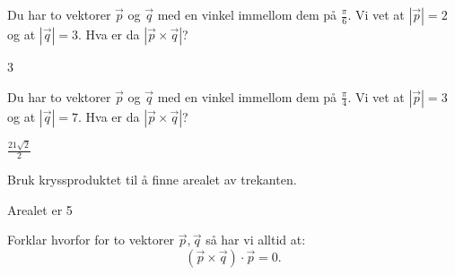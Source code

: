 \documentclass[12pt,answer]{exam}
\begin{document}
\begin{questions}
\question Du har to vektorer $\vec{p}$ og $\vec{q}$ med en vinkel immellom dem på $\frac{\pi}{6}$. 
Vi vet at $|\vec{p}| = 2$ og at $|\vec{q}| = 3$. Hva er da $|\vec{p} \times \vec{q}|$?
\begin{solution}
3
\end{solution}

\question Du har to vektorer $\vec{p}$ og $\vec{q}$ med en vinkel immellom dem på $\frac{\pi}{4}$. 
Vi vet at $|\vec{p}| = 3$ og at $|\vec{q}| = 7$. Hva er da $|\vec{p} \times \vec{q}|$?
\begin{solution}
$\frac{21\sqrt{2}}{2}$
\end{solution}

\begin{minipage}{0.5\textwidth}
\question Bruk kryssproduktet til å finne arealet av trekanten.
\begin{solution}
Arealet er 5
\end{solution}
\end{minipage}%
\begin{minipage}{0.5\textwidth}
\end{minipage}%


\question
{}

\question Forklar hvorfor for to vektorer $\vec{p},\vec{q}$ så har vi alltid at:
\[
(\vec{p} \times \vec{q}) \cdot \vec{p} = 0.
\]


\end{questions}
\end{document}
